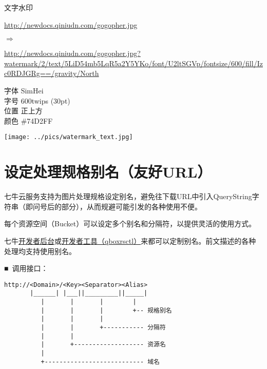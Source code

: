 \documentclass[11pt, oneside]{book}
\newcommand{\qsym}[1]{
\footnotesize
\noindent
#1\par
\normalsize
}
\newcommand{\qpara}[1]{
\vspace{0.3em}
\noindent
#1\par
\vspace{0.3em}
}
\newcommand{\qsamplelink}[1]{
\vspace{0.2em}
\noindent
#1\par
\vspace{0.1em}
}
\newcommand{\qurl}[1]{\footnotesize\url{#1}\normalsize}
\begin{document}
\begin{sample}
  \caption{文字水印}
    \qsamplelink{\qurl{http://newdocs.qiniudn.com/gogopher.jpg}}
    \qsym{$\Rightarrow$}
    \qurl{http://newdocs.qiniudn.com/gogopher.jpg?watermark/2/text/5LiD54mb5LqR5a2Y5YKo/font/U2ltSGVp/fontsize/600/fill/Izc0RDJGRg==/gravity/North}
    \linebreak

\footnotesize
\qpara{字体 SimHei \\ 字号 600twips (30pt) \\ 位置 正上方 \\ 颜色 \#74D2FF}
\normalsize

    \begin{center}
      \texttt{[image: ../pics/watermark\_text.jpg]}
    \end{center}
\end{sample}

\clearpage

\section{设定处理规格别名（友好URL）}

\qpara{七牛云服务支持为图片处理规格设定别名，避免往下载URL中引入QueryString字符串（即问号后的部分），从而规避可能引发的各种使用不便。}
\qpara{每个资源空间（Bucket）可以设定多个别名和分隔符，以提供灵活的使用方式。}
\qpara{七牛\href{https://portal.qiniu.com}{开发者后台}或\href{http://docs.qiniu.com/tools/v6/qboxrsctl.html}{开发者工具（qboxrsctl）}来都可以定制别名。前文描述的各种处理均支持使用别名。}

\qpara{■\ 调用接口：}
\begin{lstlisting}
http://<Domain>/<Key><Separator><Alias>
       |______| |___||_________||_____|
          |       |       |        |
          |       |       |        +-- 规格别名
          |       |       |
          |       |       +----------- 分隔符
          |       |
          |       +------------------- 资源名
          |
          +--------------------------- 域名
\end{lstlisting}
\end{document}
